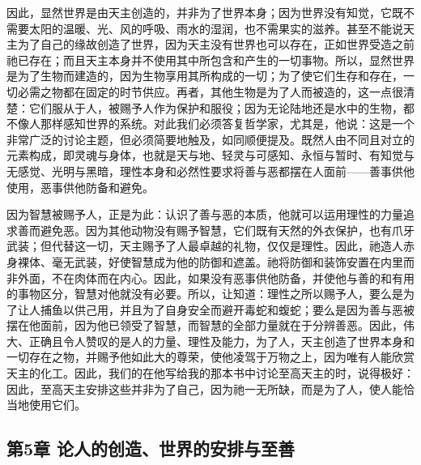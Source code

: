 因此，显然世界是由天主创造的，并非为了世界本身；因为世界没有知觉，它既不需要太阳的温暖、光、风的呼吸、雨水的湿润，也不需果实的滋养。甚至不能说天主为了自己的缘故创造了世界，因为天主没有世界也可以存在，正如世界受造之前祂已存在；而且天主本身并不使用其中所包含和产生的一切事物。所以，显然世界是为了生物而建造的，因为生物享用其所构成的一切；为了使它们生存和存在，一切必需之物都在固定的时节供应。再者，其他生物是为了人而被造的，这一点很清楚：它们服从于人，被赐予人作为保护和服役；因为无论陆地还是水中的生物，都不像人那样感知世界的系统。对此我们必须答复哲学家，尤其是，他说：这是一个非常广泛的讨论主题，但必须简要地触及，如同顺便提及。既然人由不同且对立的元素构成，即灵魂与身体，也就是天与地、轻灵与可感知、永恒与暂时、有知觉与无感觉、光明与黑暗，理性本身和必然性要求将善与恶都摆在人面前——善事供他使用，恶事供他防备和避免。\par

因为智慧被赐予人，正是为此：认识了善与恶的本质，他就可以运用理性的力量追求善而避免恶。因为其他动物没有赐予智慧，它们既有天然的外衣保护，也有爪牙武装；但代替这一切，天主赐予了人最卓越的礼物，仅仅是理性。因此，祂造人赤身裸体、毫无武装，好使智慧成为他的防御和遮盖。祂将防御和装饰安置在内里而非外面，不在肉体而在内心。因此，如果没有恶事供他防备，并使他与善的和有用的事物区分，智慧对他就没有必要。所以，让知道：理性之所以赐予人，要么是为了让人捕鱼以供己用，并且为了自身安全而避开毒蛇和蝮蛇；要么是因为善与恶被摆在他面前，因为他已领受了智慧，而智慧的全部力量就在于分辨善恶。因此，伟大、正确且令人赞叹的是人的力量、理性及能力，为了人，天主创造了世界本身和一切存在之物，并赐予他如此大的尊荣，使他凌驾于万物之上，因为唯有人能欣赏天主的化工。因此，我们的在他写给我的那本书中讨论至高天主的时，说得极好：因此，至高天主安排这些并非为了自己，因为祂一无所缺，而是为了人，使人能恰当地使用它们。\par


\subsection{第5章 论人的创造、世界的安排与至善}

